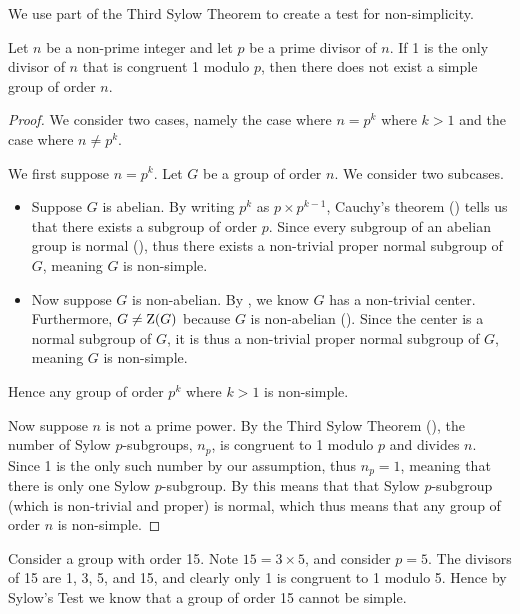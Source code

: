 We use part of the Third Sylow Theorem to create a test for non-simplicity.

\begin{theorem}
    Let $n$ be a non-prime integer and let $p$ be a prime divisor of $n$. If 1 is the only divisor of $n$ that is congruent 1 modulo $p$, then there does not exist a simple group of order $n$.
\end{theorem}
\begin{proof}
    We consider two cases, namely the case where $n=p^k$ where $k>1$ and the case where $n \neq p^k$.

    We first suppose $n = p^k$. Let $G$ be a group of order $n$. We consider two subcases.
    \begin{itemize}
        \item Suppose $G$ is abelian. By writing $p^k$ as $p \times p^{k-1}$, Cauchy's theorem () tells us that there exists a subgroup of order $p$. Since every subgroup of an abelian group is normal (), thus there exists a non-trivial proper normal subgroup of $G$, meaning $G$ is non-simple.
        \item Now suppose $G$ is non-abelian. By , we know $G$ has a non-trivial center. Furthermore, $G \neq \mathrm{Z}(G)$ because $G$ is non-abelian (). Since the center is a normal subgroup of $G$, it is thus a non-trivial proper normal subgroup of $G$, meaning $G$ is non-simple.
    \end{itemize}
    Hence any group of order $p^k$ where $k > 1$ is non-simple.

    Now suppose $n$ is not a prime power. By the Third Sylow Theorem (), the number of Sylow $p$-subgroups, $n_p$, is congruent to 1 modulo $p$ and divides $n$. Since 1 is the only such number by our assumption, thus $n_p = 1$, meaning that there is only one Sylow $p$-subgroup. By  this means that that Sylow $p$-subgroup (which is non-trivial and proper) is normal, which thus means that any group of order $n$ is non-simple.
\end{proof}
\begin{example}
    Consider a group with order 15. Note $15 = 3 \times 5$, and consider $p = 5$. The divisors of 15 are 1, 3, 5, and 15, and clearly only 1 is congruent to 1 modulo 5. Hence by Sylow's Test we know that a group of order 15 cannot be simple.
\end{example}

